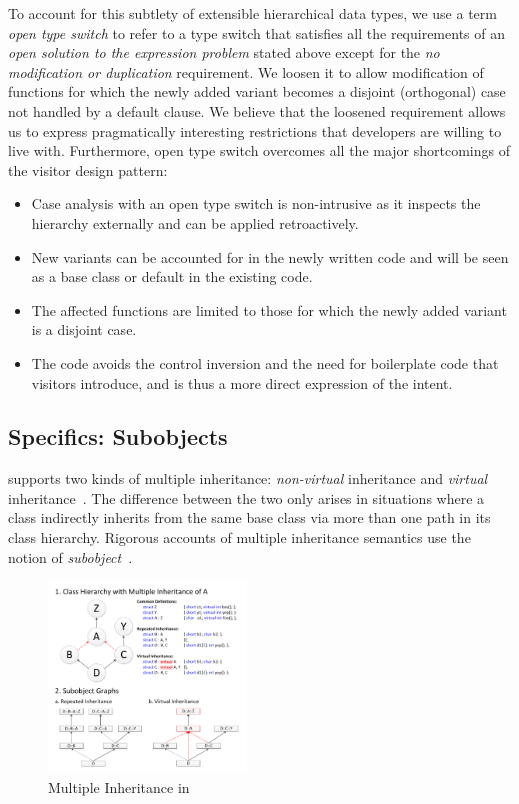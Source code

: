 To account for this subtlety of extensible hierarchical data types, we use a 
term \emph{open type switch} to refer to a type switch that satisfies all the 
requirements of an \emph{open solution to the expression problem} stated above 
except for the \emph{no modification or duplication} requirement. We loosen it 
to allow modification of functions for which the newly added variant becomes a 
disjoint (orthogonal) case not handled by a default clause. We believe that the 
loosened requirement allows us to express pragmatically interesting restrictions 
that developers are willing to live with. Furthermore, 
open type switch overcomes 
all the major shortcomings of the visitor design pattern:
%
\begin{itemize}
\setlength{\itemsep}{0pt}
\setlength{\parskip}{0pt}
\item Case analysis with an open type switch is non-intrusive as it 
      inspects the hierarchy externally and can be applied retroactively. 
\item New variants can be accounted for in the newly written code and will be 
      seen as a base class or default in the existing code.
\item The affected functions are limited to those for which the newly added 
      variant is a disjoint case.
\item The code avoids the control inversion and the need for boilerplate code 
      that visitors introduce, and is thus a more direct expression of the 
      intent.
\end{itemize}

\subsection{\Cpp{} Specifics: Subobjects}
\label{sec:specifics}

\Cpp{} supports two kinds of multiple inheritance: 
\emph{non-virtual} inheritance and \emph{virtual} inheritance~\cite{CPPARM90}. 
The difference between the two only arises in situations where a 
class indirectly inherits from the same base class via more than one path
in its class hierarchy.  Rigorous accounts of \Cpp{} multiple inheritance
semantics use the notion of \emph{subobject}~\cite{RF95}.

\begin{figure}[htbp]
  \centering
    \includegraphics[width=0.47\textwidth]{Inheritance.pdf}
  \caption{Multiple Inheritance in \Cpp{}}
  \label{fig:inheritance}
\end{figure}

